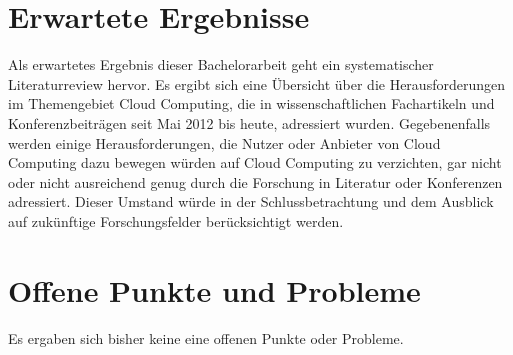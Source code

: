 \documentclass[
	a4paper,
	oneside,
	12pt,
	liststotocnumbered
]{article}
\begin{document}
\section{Erwartete Ergebnisse}
Als erwartetes Ergebnis dieser Bachelorarbeit geht ein systematischer Literaturreview hervor. Es ergibt sich eine Übersicht über die Herausforderungen im Themengebiet Cloud Computing, die in wissenschaftlichen Fachartikeln und Konferenzbeiträgen seit Mai 2012 bis heute, adressiert wurden. Gegebenenfalls werden einige Herausforderungen, die Nutzer oder Anbieter von Cloud Computing dazu bewegen würden auf Cloud Computing zu verzichten, gar nicht oder nicht ausreichend genug durch die Forschung in Literatur oder Konferenzen adressiert. Dieser Umstand würde in der Schlussbetrachtung und dem Ausblick auf zukünftige Forschungsfelder berücksichtigt werden.

\section{Offene Punkte und Probleme}
Es ergaben sich bisher keine eine offenen Punkte oder Probleme.

\newpage
\printbibliography[title={Literaturverzeichnis}]
\end{document}
